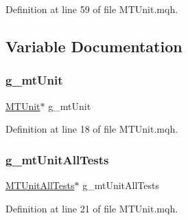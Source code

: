 Definition at line 59 of file M\+T\+Unit.\+mqh.



\subsection{Variable Documentation}
\mbox{\label{_m_t_unit_8mqh_a26846c3d9a3b28dcdfd39654d4527685}} 
\subsubsection{\texorpdfstring{g\+\_\+mt\+Unit}{g\_mtUnit}}
{\footnotesize\ttfamily \mbox{\hyperlink{class_m_t_unit}{M\+T\+Unit}}$\ast$ g\+\_\+mt\+Unit}



Definition at line 18 of file M\+T\+Unit.\+mqh.

\mbox{\label{_m_t_unit_8mqh_af8a46b5767cc8d41db82ddc69eb9f46e}} 
\subsubsection{\texorpdfstring{g\+\_\+mt\+Unit\+All\+Tests}{g\_mtUnitAllTests}}
{\footnotesize\ttfamily \mbox{\hyperlink{class_m_t_unit_all_tests}{M\+T\+Unit\+All\+Tests}}$\ast$ g\+\_\+mt\+Unit\+All\+Tests}



Definition at line 21 of file M\+T\+Unit.\+mqh.

